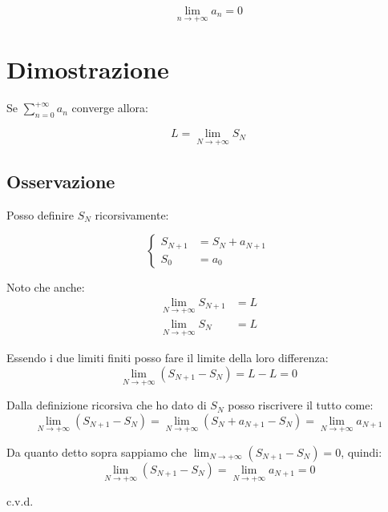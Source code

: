 \documentclass[../../dimostrazioni]{subfiles}
\begin{document}
                \[  \lim_{n \to +\infty} a_n = 0  \]

        \section*{Dimostrazione}

            Se \(\sum_{n=0}^{+\infty} a_n \) converge allora:

            \[  L = \lim_{N \to +\infty} S_N   \]

            \subsection*{Osservazione}

                Posso definire \(S_N\) ricorsivamente:

                \[  
                    \left\{
                        \begin{aligned}
                            S_{N+1} &= S_N + a_{N+1}\\
                            S_0 &= a_0
                        \end{aligned}
                    \right.
                \]

            Noto che anche:
            \begin{align*}
                \lim_{N \to +\infty} S_{N+1} &= L\\
                \lim_{N \to +\infty} S_{N} &= L
            \end{align*}
            
            Essendo i due limiti finiti posso fare il limite della loro differenza:
            \[  \lim_{N \to +\infty}\left(S_{N+1} - S_N \right) = L - L = 0  \]

            Dalla definizione ricorsiva che ho dato di \(S_N\) posso riscrivere il tutto come:
            \[  \lim_{N \to +\infty}\left(S_{N+1} - S_N \right) = \lim_{N \to +\infty} \left(S_N + a_{N+1} - S_N \right) = \lim_{N \to +\infty} a_{N+1} \]

            Da quanto detto sopra sappiamo che \(  \lim_{N \to +\infty}\left(S_{N+1} - S_N \right) = 0  \), quindi:
            \[  \lim_{N \to +\infty}\left(S_{N+1} - S_N \right) = \lim_{N \to +\infty} a_{N+1} = 0 \]

            c.v.d.
\end{document}
